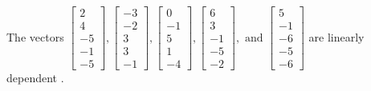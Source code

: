\begin{exercise}
\begin{exerciseStatement}
  \end{exerciseStatement}
  \begin{exerciseAnswer}
   The vectors \(\left[\begin{array}{r}
2 \\
4 \\
-5 \\
-1 \\
-5
\end{array}\right] , \left[\begin{array}{r}
-3 \\
-2 \\
3 \\
3 \\
-1
\end{array}\right] , \left[\begin{array}{r}
0 \\
-1 \\
5 \\
1 \\
-4
\end{array}\right] , \left[\begin{array}{r}
6 \\
3 \\
-1 \\
-5 \\
-2
\end{array}\right] , \text{ and } \left[\begin{array}{r}
5 \\
-1 \\
-6 \\
-5 \\
-6
\end{array}\right]\) are 
  	 linearly dependent  .
  


  \end{exerciseAnswer}
\end{exercise}